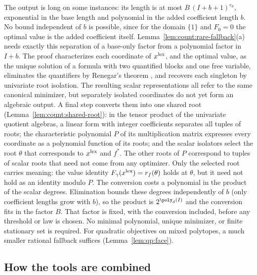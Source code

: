 The output is long on some instances: its length is at most
$B\,(I+b+1)^{e_d}$, exponential in the base length and polynomial in the
added coefficient length $b$. No bound independent of $b$ is possible, since
for the domain $\{1\}$ and $F_0=0$ the optimal value is the added coefficient
itself. Lemma~\ref{lem:count:rare-fallback}(a) needs exactly this separation
of a base-only factor from a polynomial factor in $I+b$. The proof
characterizes each coordinate of $x^{\rm lex}$, and the optimal value, as the
unique solution of a formula with two quantified blocks and one free
variable, eliminates the quantifiers by Renegar's theorem
\cite{renegar1992-on-the-computational-complexity-and}, and recovers each
singleton by univariate root isolation. The resulting scalar representations
all refer to the same canonical minimizer, but separately isolated
coordinates do not yet form an algebraic output. A final step converts them
into one shared root (Lemma~\ref{lem:count:shared-root}): in the tensor
product of the univariate quotient algebras, a linear form with integer
coefficients separates all tuples of roots; the characteristic polynomial $P$
of its multiplication matrix expresses every coordinate as a polynomial
function of its roots; and the scalar isolators select the root $\theta$
that corresponds to $x^{\rm lex}$ and $f^*$. The other roots of $P$
correspond to tuples of scalar roots that need not come from any optimizer.
Only the selected root carries meaning: the value identity
$F_\gamma(x^{\rm lex})=r_f(\theta)$ holds at $\theta$, but it need not hold as
an identity modulo $P$. The conversion costs a polynomial in the product of
the scalar degrees. Elimination bounds these degrees independently of $b$ (only
coefficient lengths grow with $b$), so the product is $2^{\poly_d(I)}$ and the
conversion fits in the factor $B$. That factor is fixed, with the conversion
included, before any threshold or law is chosen. No minimal polynomial,
unique minimizer, or finite stationary set is required. For quadratic
objectives on mixed polytopes, a much smaller rational fallback suffices
(Lemma~\ref{lem:qp:face}).

\subsection{How the tools are combined}\label{sec:count:template}

